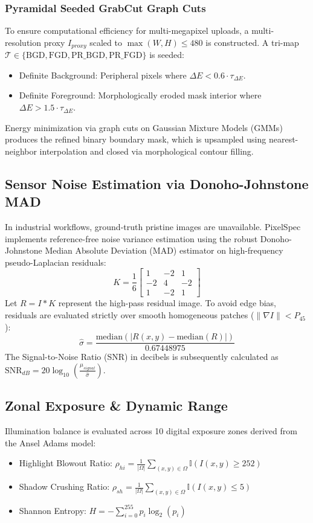 \documentclass[conference]{IEEEtran}
\begin{document}
\subsubsection{Pyramidal Seeded GrabCut Graph Cuts}
To ensure computational efficiency for multi-megapixel uploads, a multi-resolution proxy $I_{proxy}$ scaled to $\max(W, H) \le 480$ is constructed. A tri-map $\mathcal{T} \in \{\text{BGD}, \text{FGD}, \text{PR\_BGD}, \text{PR\_FGD}\}$ is seeded:
\begin{itemize}
    \item Definite Background: Peripheral pixels where $\Delta E < 0.6 \cdot \tau_{\Delta E}$.
    \item Definite Foreground: Morphologically eroded mask interior where $\Delta E > 1.5 \cdot \tau_{\Delta E}$.
\end{itemize}
Energy minimization via graph cuts on Gaussian Mixture Models (GMMs) produces the refined binary boundary mask, which is upsampled using nearest-neighbor interpolation and closed via morphological contour filling.

\subsection{Sensor Noise Estimation via Donoho-Johnstone MAD}
In industrial workflows, ground-truth pristine images are unavailable. PixelSpec implements reference-free noise variance estimation using the robust Donoho-Johnstone Median Absolute Deviation (MAD) estimator on high-frequency pseudo-Laplacian residuals:
\begin{equation}
K = \frac{1}{6} \begin{bmatrix} 1 & -2 & 1 \\ -2 & 4 & -2 \\ 1 & -2 & 1 \end{bmatrix}
\end{equation}
Let $R = I * K$ represent the high-pass residual image. To avoid edge bias, residuals are evaluated strictly over smooth homogeneous patches ($\|\nabla I\| < P_{45}$):
\begin{equation}
\hat{\sigma} = \frac{\text{median}(|R(x,y) - \text{median}(R)|)}{0.67448975}
\end{equation}
The Signal-to-Noise Ratio (SNR) in decibels is subsequently calculated as $\text{SNR}_{dB} = 20 \log_{10} \left( \frac{\mu_{signal}}{\hat{\sigma}} \right)$.

\subsection{Zonal Exposure & Dynamic Range}
Illumination balance is evaluated across 10 digital exposure zones derived from the Ansel Adams model:
\begin{itemize}
    \item Highlight Blowout Ratio: $\rho_{hi} = \frac{1}{|\Omega|} \sum_{(x,y) \in \Omega} \mathbb{I}(I(x,y) \ge 252)$
    \item Shadow Crushing Ratio: $\rho_{sh} = \frac{1}{|\Omega|} \sum_{(x,y) \in \Omega} \mathbb{I}(I(x,y) \le 5)$
    \item Shannon Entropy: $H = - \sum_{i=0}^{255} p_i \log_2(p_i)$
\end{itemize}
\end{document}
